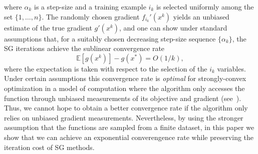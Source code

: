 \documentclass{article}
\newcommand{\mysec}[1]{Section~\ref{sec:#1}}
\begin{document}
where $\alpha_k$ is a step-size and a training example $i_k$ is selected
uniformly among the set $\{1,\dots,n\}$.
The randomly chosen gradient $f_{i_k}'(x^k)$ yields an unbiased estimate of
the true gradient $g'(x^k)$, and one can show under standard assumptions that,
for a suitably chosen decreasing step-size sequence $\{\alpha_k\}$, the SG
iterations achieve the sublinear convergence rate
\[
\mathbb{E}[g(x^k)] - g(x^\ast) = O(1/k),
\]
where the expectation is taken with respect to the selection of the $i_k$ variables.
Under certain assumptions this convergence rate is \emph{optimal} for strongly-convex optimization in a model of computation where the algorithm only accesses the function through unbiased measurements of its objective and gradient (see~\cite{nemirovsky1983problem,nemirovski2009robust,agarwal2010information}).
Thus, we cannot hope to obtain a better convergence rate if the algorithm only relies on unbiased gradient measurements.  Nevertheless, by using the stronger assumption that the functions are sampled from a finite dataset, in this paper we show that we can achieve an exponential converengence rate while preserving the iteration cost of SG methods.
\end{document}
